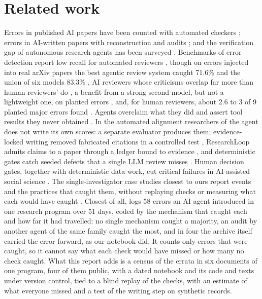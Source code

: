 \documentclass[11pt]{article}
\begin{document}
\section{Related work}

Errors in published AI papers have been counted with automated checkers \citep{bianchi2025err}; errors in AI-written papers with
reconstruction and audits \citep{miyai2026paperrecon,beel2025sakana,miyai2025jr,bianchi2025agents4science}; and the verification
gap of autonomous research agents has been surveyed \citep{ding2026verification}. Benchmarks of error detection report low recall
for automated reviewers \citep{son2025spot,xi2025flaws,baumgartner2026scicoqa}, though on errors injected into real arXiv papers the
best agentic review system caught 71.6\% and the union of six models 83.3\% \citep{nguyen2026agenticreview}, AI reviewers whose criticisms overlap far more than
human reviewers' do \citep{kim2026reviewers}, a benefit from a strong second model, but not a lightweight one, on planted errors \citep{song2026second}, and, for human reviewers,
about 2.6 to 3 of 9 planted major errors found \citep{schroter2008errors}. Agents overclaim what they did \citep{smyth2026overclaiming}
and assert tool results they never obtained \citep{gurram2026agentprop}. In the automated alignment researchers of \citet{chen2026aar} the agent does not
write its own scores: a separate evaluator produces them; evidence-locked writing removed
fabricated citations in a controlled test \citep{jha2026paperpilot}, ResearchLoop admits claims to a paper through a ledger bound to
evidence \citep{xia2026researchloop}, and deterministic gates catch seeded
defects that a single LLM review misses \citep{nam2026gates}. Human decision gates, together with deterministic data work, cut
critical failures in AI-assisted social science \citep{zhu2026attention}. The single-investigator case studies closest to ours report events and the practices that caught them, without replaying checks
or measuring what each would have caught
\citep{alzahrani2026persistent,nguyen2026physics,schwartz2026vibe}. Closest of all, \citet{orden2026wrongclaim} logs 58 errors an
AI agent introduced in one research program over 51 days, coded by the mechanism that caught each and how far it had travelled:
no single mechanism caught a majority, an audit by another agent of the same family caught the most, and in four the archive
itself carried the error forward, as our notebook did. It counts only errors that were caught, so it cannot say what each check
would have missed or how many no check caught. What this report adds is a census of the errata in six
documents of one program, four of them public, with a dated notebook and its code and texts under version control, tied to a blind
replay of the checks, with an estimate of what everyone
missed and a test of the writing step on synthetic records.
\end{document}
